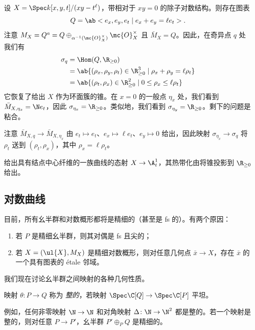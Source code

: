 \begin{exm}
    设 \(X = \Spec k[x,y,t]/(xy-t^{\ell})\)，带相对于 \(xy = 0\) 的除子对数结构。则存在图表
    \[ Q = \ab<e_x, e_y, e_t \mid e_x + e_y = \ell e_t>. \]
    注意 \(M_X = Q^a = Q \oplus_{\alpha^{-1}(\mc{O}_X^{\times})} \mc{O}_X^{\times}\) 且 \(\bar{M}_X = Q\)。因此，在奇异点 \(q\) 处我们有
    \begin{align*}
        \sigma_q &= \Hom(Q, \R_{\geq 0}) \\
        &= \ab\{ (\rho_x, \rho_y, \rho_t) \in \R_{\geq 0}^3 \mid \rho_x + \rho_y = \ell \rho_t \} \\
        &= \ab\{ (\rho_t, \rho_x) \in \R_{\geq 0}^2 \mid 0 \leq \rho_x \leq \ell \rho_t \}
    \end{align*}
    它恢复了给出 \(X\) 作为环面簇的锥。在 \(x = 0\) 的一般点 \(\eta_x\) 处，我们看到 \(\bar{M}_{X, \eta_x} = \N e_t\)，因此 \(\sigma_{\eta_x} = \R_{\geq 0}\)。类似地，我们看到 \(\sigma_{\eta_y} = \R_{\geq 0}\)。剩下的问题是粘合。

    注意 \(\bar{M}_{X, q} \to \bar{M}_{X, \eta_x}\) 由 \(e_t \mapsto e_t\)、\(e_x \mapsto \ell e_t\)、\(e_y \mapsto 0\) 给出，因此映射 \(\sigma_{\eta_x} \to \sigma_q\) 将 \(\rho_t\) 送到 \((\rho_t, \rho_x)\)，其中 \(\rho_x = \ell \rho_t\)。

    给出具有结点中心纤维的一族曲线的态射 \(X \to \A^1_t\)，其热带化由将锥投影到 \(\R_{\geq 0}\) 给出。
\end{exm}


\subsection{对数曲线}%
\label{sub:Log curves}

目前，所有幺半群和对数概形都将是精细的（甚至是 fs 的）。有两个原因：
\begin{enumerate}
    \item 若 \(P\) 是精细幺半群，则其对偶是 fs 且尖的；
    \item 若 \(X = (\ul{X}, M_X)\) 是精细对数概形，则对任意几何点 \(\bar{x} \to X\)，存在 \(\bar{x}\) 的一个具有图表的 \'etale 邻域。
\end{enumerate}

我们现在讨论幺半群之间映射的各种几何性质。
\begin{defn}
    映射 \(\theta \colon P \to Q\) 称为 \textit{整的}，若映射 \(\Spec\C[Q] \to \Spec \C[P]\) 平坦。
\end{defn}

例如，任何非零映射 \(\N \to \N\) 和对角映射 \(\Delta \colon\N \to \N^2\) 都是整的。若一个映射是整的，则对任意 \(P \to P'\)，幺半群 \(P' \oplus_P Q\) 是精细的。


